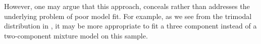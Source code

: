 However, one may argue that this approach, conceals rather than addresses the underlying problem of poor model fit.
For example, as we see from the trimodal distribution in ,
it may be more appropriate to fit a three component instead of a two-component mixture model on this sample.







